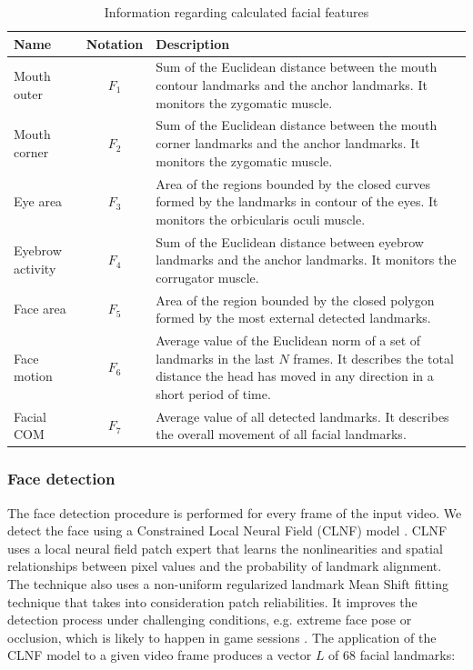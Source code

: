 \begin{landscape}
\begin{table}
    \centering
    \caption{Information regarding calculated facial features}
    \label{table:features}
    \begin{tabular}[l]{@{}lcp{11cm}}
        \hline
            \textbf{Name} & \textbf{Notation} & \textbf{Description} \\
        \hline
            Mouth outer & $F_1$ & Sum of the Euclidean distance between the mouth contour landmarks and the anchor landmarks. It monitors the zygomatic muscle.  \\
            Mouth corner & $F_2$ & Sum of the Euclidean distance between the mouth corner landmarks and the anchor landmarks. It monitors the zygomatic muscle. \\
            Eye area & $F_3$ & Area of the regions bounded by the closed curves formed by the landmarks in contour of the eyes. It monitors the orbicularis oculi muscle. \\
            Eyebrow activity & $F_4$ & Sum of the Euclidean distance between eyebrow landmarks and the anchor landmarks. It monitors the corrugator muscle.  \\
            Face area & $F_5$ & Area of the region bounded by the closed polygon formed by the most external detected landmarks.  \\
            Face motion & $F_6$ & Average value of the Euclidean norm of a set of landmarks in the last $N$ frames. It describes the total distance the head has moved in any direction in a short period of time.  \\
            Facial COM & $F_7$ & Average value of all detected landmarks. It describes the overall movement of all facial landmarks.  \\
        \hline
    \end{tabular}
\end{table}
\end{landscape}

\subsubsection{Face detection}

The face detection procedure is performed for every frame of the input video. We detect the face using a Constrained Local Neural Field (CLNF) model \cite{baltrusaitis2013constrained,baltruvsaitis2016openface}. CLNF uses a local neural field patch expert that learns the nonlinearities and spatial relationships between pixel values and the probability of landmark alignment. The technique also uses a non-uniform regularized landmark Mean Shift fitting technique that takes into consideration patch reliabilities. It improves the detection process under challenging conditions, e.g. extreme face pose or occlusion, which is likely to happen in game sessions \cite{bevilacqua2016variations}. The application of the CLNF model to a given video frame produces a vector $L$ of 68 facial landmarks:

